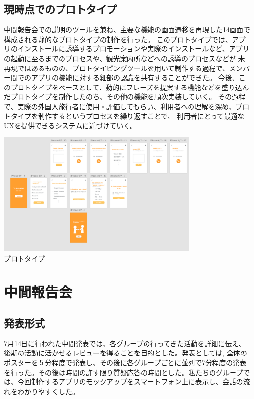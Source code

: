 \documentclass[11pt,papersize]{jsbook}
\begin{document}
\section{現時点でのプロトタイプ}\label{sec:sannosan}
 中間報告会での説明のツールを兼ね、主要な機能の画面遷移を再現した14画面で構成される静的なプロトタイプの制作を行った。
このプロトタイプでは、アプリのインストールに誘導するプロモーションや実際のインストールなど、アプリの起動に至るまでのプロセスや、観光案内所などへの誘導のプロセスなどが
未再現ではあるものの、プロトタイピングツールを用いて制作する過程で、メンバー間でのアプリの機能に対する細部の認識を共有することができた。
今後、このプロトタイプをベースとして、動的にフレーズを提案する機能などを盛り込んだプロトタイプを制作したのち、その他の機能を順次実装していく。
その過程で、実際の外国人旅行者に使用・評価してもらい、利用者への理解を深め、プロトタイプを制作するというプロセスを繰り返すことで、
利用者にとって最適なUXを提供できるシステムに近づけていく。
\begin{center}
\includegraphics[width=10cm]{img/screen_sample.png}\\
プロトタイプ
\end{center}


\chapter{中間報告会}

\section{発表形式}
 7月14日に行われた中間発表では、各グループの行ってきた活動を詳細に伝え、後期の活動に活かせるレビューを得ることを目的とした。発表としては, 全体のポスターを５分程度で発表し、その後に各グループごとに並列で7分程度の発表を行った。その後は時間の許す限り質疑応答の時間とした。私たちのグループでは、今回制作するアプリのモックアップをスマートフォン上に表示し、会話の流れをわかりやすくした。
\end{document}
